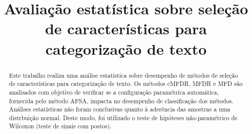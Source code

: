 \documentclass[conference]{IEEEtran}
\begin{document}
%
\title{\vspace{0.25in}Avaliação estatística sobre seleção de características para categorização de texto}



\author{
}

\maketitle

\begin{abstract}
Este trabalho realiza uma análise estatística sobre desempenho de métodos de seleção de características para categorização de texto. Os métodos cMFDR, MFDR e MFD são analisados com objetivo de verificar se a configuração paramétrica automática, fornecida pelo método AFSA, impacta no desempenho de classificação dos métodos. Análises estatísticas não foram conclusivas quanto à aderência das amostras a uma distrbuição normal. Deste modo, foi utilizado o teste de hipóteses não-paramétrico de Wilcoxon (teste de sinais com postos).
\end{abstract}

\IEEEpeerreviewmaketitle

\end{document}
